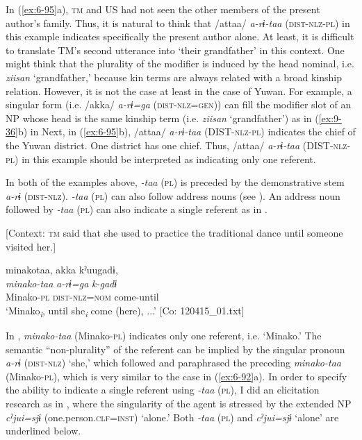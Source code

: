 In (\ref{ex:6-95}a), \textsc{tm} and US had not seen the other members of the present author’s family. Thus, it is natural to think that /attaa/ \textit{a-rɨ-taa} (\textsc{dist}-\textsc{nlz}-\textsc{pl}) in this example indicates specifically the present author alone. At least, it is difficult to translate TM’s second utterance into ‘their grandfather’ in this context. One might think that the plurality of the modifier is induced by the head nominal, i.e. \textit{ziisan} ‘grandfather,’ because kin terms are always related with a broad kinship relation. However, it is not the case at least in the case of Yuwan. For example, a singular form (i.e. /akka/ \textit{a-rɨ=ga} (\textsc{dist}-\textsc{nlz}=\textsc{gen})) can fill the modifier slot of an NP whose head is the same kinship term (i.e. \textit{ziisan} ‘grandfather’) as in (\ref{ex:9-36}b) in  Next, in (\ref{ex:6-95}b), /attaa/ \textit{a-rɨ-taa} (DIST-\textsc{nlz}-\textsc{pl}) indicates the chief of the Yuwan district. One district has one chief. Thus, /attaa/ \textit{a-rɨ-taa} (DIST-\textsc{nlz}-\textsc{pl}) in this example should be interpreted as indicating only one referent.

In both of the examples above, \textit{-taa} (\textsc{pl}) is preceded by the demonstrative stem \textit{a-rɨ} (\textsc{dist}-\textsc{nlz}). \textit{-taa} (\textsc{pl}) can also follow address nouns (see ). An address noun followed by \textit{-taa} (\textsc{pl}) can also indicate a single referent as in .

\ea\label{ex:6-96}
  [Context: \textsc{tm} said that she used to practice the traditional dance until someone visited her.]

{\TM}
\glll minakotaa,  akka  kˀuugadɨ,\\
\textit{minako-taa}  \textit{a-rɨ=ga}  \textit{k-gadɨ}\\
    Minako-\textsc{pl}  \textsc{dist}-\textsc{nlz}=\textsc{nom}  come-until\\
\glt    ‘Minako\textit{\textsubscript{i}}, until she\textit{\textsubscript{i}} come (here), ...’ [Co: 120415\_01.txt]
\z

In , \textit{minako-taa} (Minako-\textsc{pl}) indicates only one referent, i.e. ‘Minako.’ The semantic “non-plurality” of the referent can be implied by the singular pronoun \textit{a-rɨ} (\textsc{dist}-\textsc{nlz}) ‘she,’ which followed and paraphrased the preceding \textit{minako-taa} (Minako-\textsc{pl}), which is very similar to the case in (\ref{ex:6-92}a). In order to specify the ability to indicate a single referent using \textit{-taa} (\textsc{pl}), I did an elicitation research as in , where the singularity of the agent is stressed by the extended NP \textit{cˀjui=sjɨ} (one.person.\textsc{clf}=\textsc{inst}) ‘alone.’ Both \textit{-taa} (\textsc{pl}) and \textit{cˀjui=sjɨ} ‘alone’ are underlined below.

